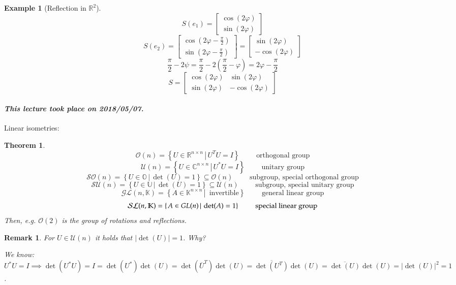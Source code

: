 \documentclass{article}
\newtheorem{theorem}{Theorem}  \numberwithin{theorem}{section}
\newtheorem{example}{Example}  \numberwithin{example}{section}
\newtheorem{remark}{Remark}  \numberwithin{remark}{section}
\newcommand{\setdef}[2]{\left\{\left.#1\,\right|\,#2\right\}}
\newcommand{\card}[1]{\left|#1\right|}
\newcommand{\dateref}[1]{\paragraph{\textit{This lecture took place on #1.}}}
\begin{document}
\begin{example}[Reflection in $\mathbb R^2$]
  \[ S(e_1) = \begin{bmatrix} \cos(2\varphi) \\ \sin(2\varphi) \end{bmatrix} \]
  \[ S(e_2) = \begin{bmatrix} \cos(2\varphi - \frac\pi2) \\ \sin(2\varphi - \frac\pi2) \end{bmatrix} = \begin{bmatrix} \sin(2\varphi) \\ -\cos(2\varphi) \end{bmatrix} \]
  \[ \frac\pi2 - 2\psi = \frac\pi2 - 2(\frac\pi2 - \varphi) = 2\varphi - \frac\pi2 \]
  \[ S = \begin{bmatrix} \cos(2\varphi) & \sin(2\varphi) \\ \sin(2\varphi) & -\cos(2\varphi) \end{bmatrix} \]
\end{example}


\dateref{2018/05/07}

Linear isometries:

\begin{theorem} %
  \[ \mathcal O(n) = \setdef{U \in \mathbb R^{n\times n}}{U^TU = I} \qquad \text{ orthogonal group} \]
  \[ \mathcal U(n) = \setdef{U \in \mathbb C^{n\times n}}{U^*U = I} \qquad \text{ unitary group} \]
  \[ \mathcal{SO}(n) = \setdef{U \in \mathbb O}{\det(U) = 1} \subseteq \mathcal O(n) \qquad \text{ subgroup, special orthogonal group} \]
  \[ \mathcal{SU}(n) = \setdef{U \in \mathbb U}{\det(U) = 1} \subseteq \mathcal U(n) \qquad \text{ subgroup, special unitary group} \]
  \[ \mathcal{GL}(n, \mathbb K) = \setdef{A \in \mathbb K^{n\times n}}{\text{ invertible}} \qquad \text{ general linear group} \]
  \[ \mathcal{SL}(n, \mathbb K) = \setdef{A \in \mathbb \mathcal{GL}(n)}{\det(A) = 1} \qquad \text{ special linear group} \]
  Then, e.g. $\mathcal O(2)$ is the group of rotations and reflections.
\end{theorem}

\begin{remark}
  For $U \in \mathcal U(n)$ it holds that $\card{\det(U)} = 1$. Why?

  We know: $U^* U = I \implies \det(U^* U) = I = \det(U^*) \det(U) = \det(\overline{U}^T) \det(U) = \overline{\det(U^T)} \det(U) = \overline{\det(U)} \det(U) = \card{\det(U)}^2 = 1$.
\end{remark}
\end{document}
